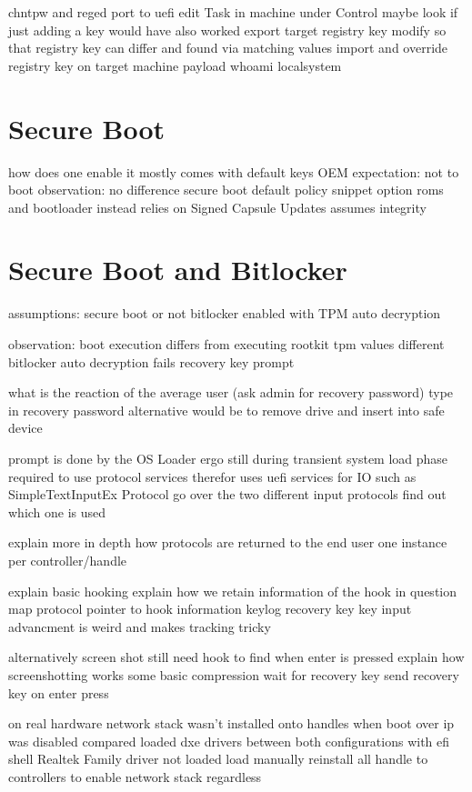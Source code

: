 chntpw and reged
port to uefi
edit Task in machine under Control
maybe look if just adding a key would have also worked
export target registry key
modify so that registry key can differ and found via matching values
import and override registry key on target machine
payload whoami
localsystem


\section{Secure Boot}
how does one enable it
mostly comes with default keys OEM
expectation:
not to boot
observation:
no difference
secure boot default policy snippet
option roms and bootloader
instead relies on Signed Capsule Updates
assumes integrity


\section{Secure Boot and Bitlocker}
assumptions:
secure boot or not
bitlocker enabled with TPM auto decryption

observation:
boot execution differs from executing rootkit
tpm values different
bitlocker auto decryption fails
recovery key prompt

what is the reaction of the average user
(ask admin for recovery password)
type in recovery password
alternative would be to remove drive and insert into safe device

prompt is done by the OS Loader
ergo still during transient system load phase
required to use protocol services
therefor uses uefi services for IO
such as SimpleTextInputEx Protocol
go over the two different input protocols
find out which one is used

explain more in depth how protocols are returned to the end user
one instance per controller/handle

explain basic hooking
explain how we retain information of the hook in question
map protocol pointer to hook information
keylog recovery key
key input advancment is weird and makes tracking tricky

alternatively screen shot
still need hook to find when enter is pressed
explain how screenshotting works
some basic compression
wait for recovery key
send recovery key on enter press

on real hardware
network stack wasn't installed onto handles when boot over ip was disabled
compared loaded dxe drivers between both configurations with efi shell
Realtek Family driver not loaded
load manually
reinstall all handle to controllers to enable network stack regardless


